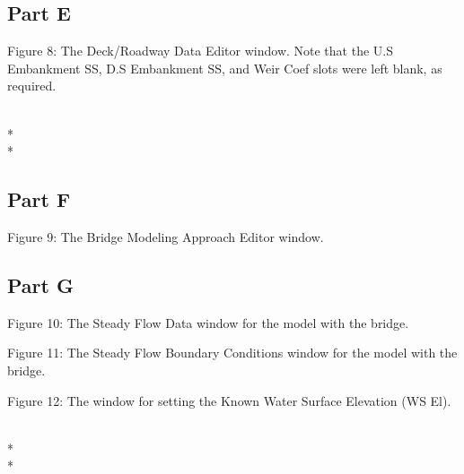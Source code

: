 \documentclass[]{article}
\begin{document}
\subsection{Part E}
 \begin{minipage}[t]{\linewidth}
	\centering
	
	\medskip
	\begin{center} 
		Figure 8: The Deck/Roadway Data Editor window. Note that the U.S Embankment SS, D.S Embankment SS, and Weir Coef slots were left blank, as required.
	\end{center}
\end{minipage} \\* \\*
\subsection{Part F}
 \begin{minipage}[t]{\linewidth}
	\centering
	
	\medskip
	\begin{center} 
		Figure 9: The Bridge Modeling Approach Editor window.
	\end{center}
\end{minipage}
\newpage
\subsection{Part G}
 \begin{minipage}[t]{\linewidth}
	\raggedright
	
	\medskip
	\begin{center} 
		Figure 10: The Steady Flow Data window for the model with the bridge.
	\end{center}
	\bigskip
	\raggedright
	
	\medskip
	\begin{center} 
		Figure 11: The Steady Flow Boundary Conditions window for the model with the bridge.
	\end{center}
\end{minipage}
\begin{minipage}[t]{\linewidth}
	\centering
	
	\medskip
	\begin{center} 
		Figure 12: The window for setting the Known Water Surface Elevation (WS El).
	\end{center}
\end{minipage} \\* \\* 
\end{document}
